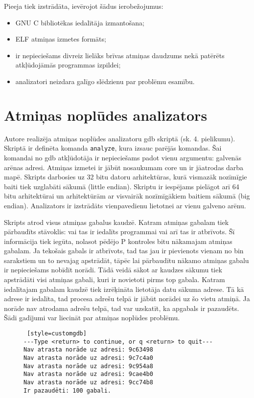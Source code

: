 Pieeja tiek izstrādāta, ievērojot šādus ierobežojumus: %
\begin{itemize}
	\item GNU C bibliotēkas iedalītāja izmantošana;
    \item ELF atmiņas izmetes formāts;
    \item ir nepieciešams divreiz lielāks brīvas atmiņas daudzums nekā patērēts atkļūdojāmās programmas izpildei;
    \item analizatori neizdara galīgo slēdzienu par problēmu esamību.
\end{itemize}



\section{Atmiņas noplūdes analizators}
Autore realizēja atmiņas noplūdes analizatoru gdb skriptā (sk. 4. pielikumu). Skriptā ir definēta komanda \texttt{analyze}, kura izsauc parējās komandas.
Šai komandai no gdb atkļūdotāja ir nepieciešams padot vienu argumentu: galvenās arēnas adresi.
Atmiņas izmetei ir jābūt nosaukumam core un ir jāatrodas darba mapē.
Skripts darbosies uz 32 bitu datoru arhitektūras, kurā vismazāk nozīmīgie baiti tiek uzglabāti sākumā (little endian).
Skriptu ir iespējams pielāgot arī 64 bitu arhitektūrai un arhitektūrām ar visvairāk nozīmīgākiem baitiem sākumā (big endian).
Analizators ir izstrādāts vienpavedienu lietotnei ar vienu galveno arēnu.



Skripts atrod visus atmiņas gabalus kaudzē. 
Katram atmiņas gabalam tiek pārbaudīts stāvoklis: vai tas ir iedalīts programmai vai arī tas ir atbrīvots.
Šī informācija tiek iegūta, nolasot pēdējo P kontroles bitu nākamajam atmiņas gabalam.
Ja tekošais gabals ir atbrīvots, tad tas jau ir pievienots vienam no bin sarakstiem un to nevajag apstrādāt, tāpēc lai pārbaudītu nākamo atmiņas gabalu ir nepieciešams nobīdīt norādi.
Tādā veidā sākot ar kaudzes sākumu tiek apstrādāti visi atmiņas gabali, kuri ir novietoti pirms top gabala.
Katram iedalītajam gabalam kaudzē tiek izrēķināta lietotāja datu sākuma adrese.
Tā kā adrese ir iedalīta, tad procesa adrešu telpā ir jābūt norādei uz šo vietu atmiņā.
Ja norāde nav atrodama adrešu telpā, tad var uzskatīt, ka apgabals ir pazaudēts.
Šādi gadījumi var liecināt par atmiņas noplūdes problēmu.

\begin{figure}[h]
\begin{lstlisting} [style=customgdb]
---Type <return> to continue, or q <return> to quit---
Nav atrasta norāde uz adresi: 9c63498
Nav atrasta norāde uz adresi: 9c7c4a0
Nav atrasta norāde uz adresi: 9c954a8
Nav atrasta norāde uz adresi: 9cae4b0
Nav atrasta norāde uz adresi: 9cc74b8
Ir pazaudēti: 100 gabali.
\end{lstlisting}
\caption{\textbf{\fontsize{11}{12}\selectfont {Atmiņas noplūdes atrašana, gdb skripta izvads}}}
\end{figure} %

